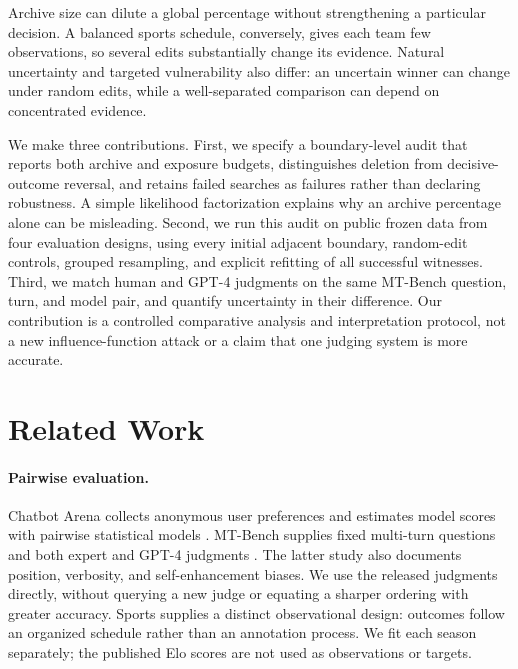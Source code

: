 \documentclass{article}
\begin{document}
Archive size can dilute a global percentage without strengthening a particular decision. A balanced sports schedule, conversely, gives each team few observations, so several edits substantially change its evidence. Natural uncertainty and targeted vulnerability also differ: an uncertain winner can change under random edits, while a well-separated comparison can depend on concentrated evidence.

We make three contributions. First, we specify a boundary-level audit that reports both archive and exposure budgets, distinguishes deletion from decisive-outcome reversal, and retains failed searches as failures rather than declaring robustness. A simple likelihood factorization explains why an archive percentage alone can be misleading. Second, we run this audit on public frozen data from four evaluation designs, using every initial adjacent boundary, random-edit controls, grouped resampling, and explicit refitting of all successful witnesses. Third, we match human and GPT-4 judgments on the same MT-Bench question, turn, and model pair, and quantify uncertainty in their difference. Our contribution is a controlled comparative analysis and interpretation protocol, not a new influence-function attack or a claim that one judging system is more accurate.

\section{Related Work}
\paragraph{Pairwise evaluation.}
Chatbot Arena collects anonymous user preferences and estimates model scores with pairwise statistical models \citep{chiang2024}. MT-Bench supplies fixed multi-turn questions and both expert and GPT-4 judgments \citep{zheng2023}. The latter study also documents position, verbosity, and self-enhancement biases. We use the released judgments directly, without querying a new judge or equating a sharper ordering with greater accuracy. Sports supplies a distinct observational design: outcomes follow an organized schedule rather than an annotation process. We fit each season separately; the published Elo scores are not used as observations or targets.
\end{document}
